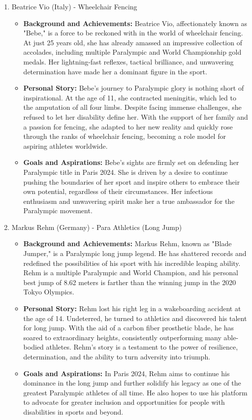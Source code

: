 \begin{enumerate}
\item Beatrice Vio (Italy) - Wheelchair Fencing
    \begin{itemize}
    \item \textbf{Background and Achievements:} Beatrice Vio, affectionately known as "Bebe," is a force to be reckoned with in the world of wheelchair fencing. At just 25 years old, she has already amassed an impressive collection of accolades, including multiple Paralympic and World Championship gold medals. Her lightning-fast reflexes, tactical brilliance, and unwavering determination have made her a dominant figure in the sport.
    \item \textbf{Personal Story:} Bebe's journey to Paralympic glory is nothing short of inspirational. At the age of 11, she contracted meningitis, which led to the amputation of all four limbs. Despite facing immense challenges, she refused to let her disability define her. With the support of her family and a passion for fencing, she adapted to her new reality and quickly rose through the ranks of wheelchair fencing, becoming a role model for aspiring athletes worldwide.
    \item \textbf{Goals and Aspirations:} Bebe's sights are firmly set on defending her Paralympic title in Paris 2024. She is driven by a desire to continue pushing the boundaries of her sport and inspire others to embrace their own potential, regardless of their circumstances. Her infectious enthusiasm and unwavering spirit make her a true ambassador for the Paralympic movement.
    \end{itemize}

\item Markus Rehm (Germany) - Para Athletics (Long Jump)
    \begin{itemize}
    \item \textbf{Background and Achievements:} Markus Rehm, known as "Blade Jumper," is a Paralympic long jump legend. He has shattered records and redefined the possibilities of his sport with his incredible leaping ability. Rehm is a multiple Paralympic and World Champion, and his personal best jump of 8.62 meters is farther than the winning jump in the 2020 Tokyo Olympics. 
    \item \textbf{Personal Story:} Rehm lost his right leg in a wakeboarding accident at the age of 14. Undeterred, he turned to athletics and discovered his talent for long jump. With the aid of a carbon fiber prosthetic blade, he has soared to extraordinary heights, consistently outperforming many able-bodied athletes. Rehm's story is a testament to the power of resilience, determination, and the ability to turn adversity into triumph.
    \item \textbf{Goals and Aspirations:} In Paris 2024, Rehm aims to continue his dominance in the long jump and further solidify his legacy as one of the greatest Paralympic athletes of all time. He also hopes to use his platform to advocate for greater inclusion and opportunities for people with disabilities in sports and beyond.
    \end{itemize}
\end{enumerate}

